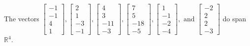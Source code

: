 \begin{exercise}
\begin{exerciseStatement}
  \end{exerciseStatement}
  \begin{exerciseAnswer}
   The vectors \(\left[\begin{array}{r}
-1 \\
-1 \\
4 \\
1
\end{array}\right] , \left[\begin{array}{r}
2 \\
1 \\
-3 \\
-1
\end{array}\right] , \left[\begin{array}{r}
4 \\
3 \\
-11 \\
-3
\end{array}\right] , \left[\begin{array}{r}
7 \\
5 \\
-18 \\
-5
\end{array}\right] , \left[\begin{array}{r}
1 \\
-1 \\
-2 \\
-4
\end{array}\right] , \text{ and } \left[\begin{array}{r}
-2 \\
2 \\
2 \\
-3
\end{array}\right]\) 
  	 do  
	span \(\mathbb{R}^4\).
  


  \end{exerciseAnswer}
\end{exercise}